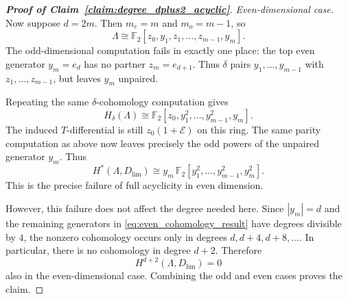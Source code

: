 \documentclass[10pt,a4paper]{amsart}
\begin{document}
\begin{proof}[\textnormal{\textbf{Proof of Claim~\ref{claim:degree_dplus2_acyclic}}}]
\medskip

\noindent \textit{Even-dimensional case.}
Now suppose $d=2m$. Then $m_e=m$ and $m_o=m-1$, so
\begin{equation}
\Lambda\cong \mathbb F_2[z_0,y_1,z_1,\dots,z_{m-1},y_m].
\end{equation}
The odd-dimensional computation fails in exactly one place: the top even generator $y_m=e_d$ has no partner $z_m=e_{d+1}$. Thus $\delta$ pairs $y_1,\dots,y_{m-1}$ with $z_1,\dots,z_{m-1}$, but leaves $y_m$ unpaired.

\noindent Repeating the same $\delta$-cohomology computation gives
\begin{equation}
H_\delta(\Lambda)
\cong
\mathbb F_2[z_0,y_1^2,\dots,y_{m-1}^2,y_m].
\label{eq:Hdelta_result_even}
\end{equation}
The induced $T$-differential is still $z_0(1+\mathcal E)$ on this ring. The same parity computation as above now leaves precisely the odd powers of the unpaired generator $y_m$. Thus
\begin{equation}
H^*(\Lambda,D_{\lim})
\cong
y_m\,\mathbb F_2[y_1^2,\dots,y_{m-1}^2,y_m^2].
\label{eq:even_cohomology_result}
\end{equation}
This is the precise failure of full acyclicity in even dimension.

\bigskip 

\noindent However, this failure does not affect the degree needed here. Since $|y_m|=d$ and the remaining generators in \eqref{eq:even_cohomology_result} have degrees divisible by $4$, the nonzero cohomology occurs only in degrees $d,d+4,d+8,\dots$. In particular, there is no cohomology in degree $d+2$. Therefore
\begin{equation}
H^{d+2}(\Lambda,D_{\lim})=0
\end{equation}
also in the even-dimensional case. Combining the odd and even cases proves the claim.
\end{proof}
\end{document}
